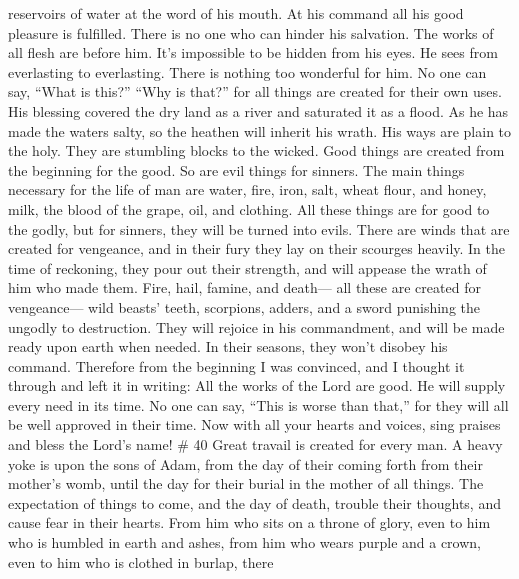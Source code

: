 reservoirs of water at the word of his mouth.  At his
command all his good pleasure is fulfilled. There is no one who can
hinder his salvation.  The works of all flesh are before
him. It's impossible to be hidden from his eyes.  He sees
from everlasting to everlasting. There is nothing too wonderful for him.
 No one can say, ``What is this?'' ``Why is that?'' for
all things are created for their own uses.  His blessing
covered the dry land as a river and saturated it as a flood.
 As he has made the waters salty, so the heathen will
inherit his wrath.  His ways are plain to the holy. They
are stumbling blocks to the wicked.  Good things are
created from the beginning for the good. So are evil things for sinners.
 The main things necessary for the life of man are water,
fire, iron, salt, wheat flour, and honey, milk, the blood of the grape,
oil, and clothing.  All these things are for good to the
godly, but for sinners, they will be turned into evils. 
There are winds that are created for vengeance, and in their fury they
lay on their scourges heavily. In the time of reckoning, they pour out
their strength, and will appease the wrath of him who made them.
 Fire, hail, famine, and death--- all these are created
for vengeance---  wild beasts' teeth, scorpions, adders,
and a sword punishing the ungodly to destruction.  They
will rejoice in his commandment, and will be made ready upon earth when
needed. In their seasons, they won't disobey his command.
 Therefore from the beginning I was convinced, and I
thought it through and left it in writing:  All the works
of the Lord are good. He will supply every need in its time.
 No one can say, ``This is worse than that,'' for they
will all be well approved in their time.  Now with all
your hearts and voices, sing praises and bless the Lord's name! \# 40
 Great travail is created for every man. A heavy yoke is
upon the sons of Adam, from the day of their coming forth from their
mother's womb, until the day for their burial in the mother of all
things.  The expectation of things to come, and the day of
death, trouble their thoughts, and cause fear in their hearts.
 From him who sits on a throne of glory, even to him who
is humbled in earth and ashes,  from him who wears purple
and a crown, even to him who is clothed in burlap,  there
